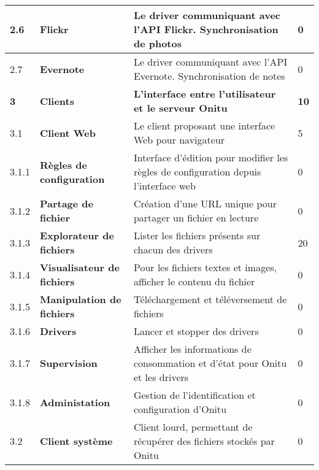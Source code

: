 \begin{center}
\begin{tabular}{|l l|l|l|}
\hline
	2.6 & \textbf{Flickr} & Le driver communiquant avec l'API Flickr.
Synchronisation de photos & 0 \tabularnewline
\hline
	2.7 & \textbf{Evernote} & Le driver communiquant avec l'API Evernote.
Synchronisation de notes & 0 \tabularnewline
\hline
\rowcolor{gray}
	\textbf{3} & \textbf{Clients} & \textbf{L'interface entre l'utilisateur et le serveur Onitu} & \textbf{10} \tabularnewline
\hline
\rowcolor{lightGray}
	3.1 & \textbf{Client Web} & Le client proposant une interface Web pour
navigateur & 5 \tabularnewline
\hline
	3.1.1 & \textbf{Règles de configuration} & Interface d'édition pour
modifier les règles de configuration depuis l'interface web & 0 \tabularnewline
\hline
	3.1.2 & \textbf{Partage de fichier} & Création d'une URL unique pour partager
un fichier en lecture & 0 \tabularnewline
\hline
	3.1.3 & \textbf{Explorateur de fichiers} & Lister les fichiers présents sur
chacun des drivers & 20 \tabularnewline
\hline
	3.1.4 & \textbf{Visualisateur de fichiers} & Pour les fichiers textes et
images, afficher le contenu du fichier & 0 \tabularnewline
\hline
	3.1.5 & \textbf{Manipulation de fichiers} & Téléchargement et téléversement de
fichiers & 0 \tabularnewline
\hline
	3.1.6 & \textbf{Drivers} & Lancer et stopper des drivers & 0 \tabularnewline
\hline
	3.1.7 & \textbf{Supervision} & Afficher les informations de consommation et
d'état pour Onitu et les drivers & 0 \tabularnewline
\hline
	3.1.8 & \textbf{Administation} & Gestion de l'identification et configuration
d'Onitu & 0 \tabularnewline
\hline
\rowcolor{lightGray}
	3.2 & \textbf{Client système} & Client lourd, permettant de récupérer des
fichiers stockés par Onitu & 0 \tabularnewline

\hline
\end{tabular}\end{center}
